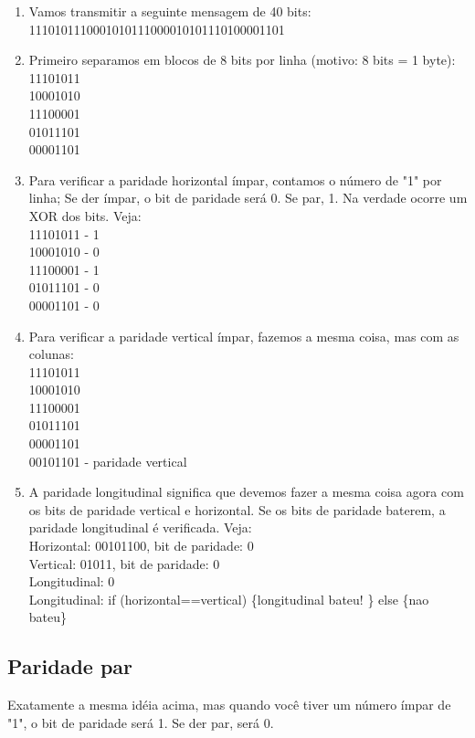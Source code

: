 \documentclass{article}
\begin{document}
\begin{enumerate}
	\item Vamos transmitir a seguinte mensagem de 40 bits:\\
		1110101110001010111000010101110100001101
	\item Primeiro separamos em blocos de 8 bits por linha (motivo: 8 bits = 1 byte):\\
		11101011\\
		10001010\\
		11100001\\
		01011101\\
		00001101\\
	\item Para verificar a paridade horizontal ímpar, contamos o número de "1" por linha; Se der ímpar, o bit de paridade será 0. Se par, 1. Na verdade ocorre um XOR dos bits. Veja:\\
                11101011 - 1\\
                10001010 - 0\\
                11100001 - 1\\
                01011101 - 0\\
                00001101 - 0
	\item Para verificar a paridade vertical ímpar, fazemos a mesma coisa, mas com as colunas:\\
                11101011\\
                10001010\\
                11100001\\
                01011101\\
                00001101\\
		00101101 - paridade vertical
	\item A paridade longitudinal significa que devemos fazer a mesma coisa agora com os bits de paridade vertical e horizontal. Se os bits de paridade baterem, a paridade longitudinal é verificada. Veja:\\
		Horizontal:	00101100, bit de paridade: 0\\
		Vertical:	01011, bit de paridade: 0\\
		Longitudinal: 0\\
		Longitudinal: if (horizontal==vertical) \{longitudinal bateu! \} else \{nao bateu\} 
\end{enumerate}

\subsection{Paridade par}
Exatamente a mesma idéia acima, mas quando você tiver um número ímpar de "1", o bit de paridade será 1. Se der par, será 0.
\end{document}
